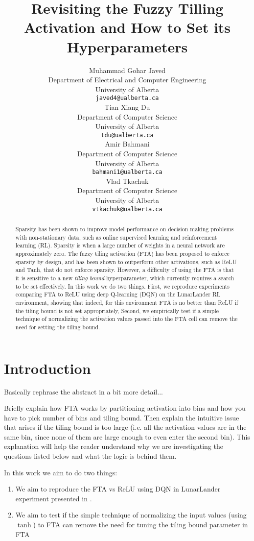 \documentclass{article}
\title{Revisiting the Fuzzy Tilling Activation and How to Set its Hyperparameters}
\author{%
  Muhammad Gohar Javed \\
  Department of Electrical and Computer Engineering \\
  University of Alberta\\
  \texttt{javed4@ualberta.ca} \\
  \And
  Tian Xiang Du \\
  Department of Computer Science\\
  University of Alberta\\
  \texttt{tdu@ualberta.ca} \\
  \AND
  Amir Bahmani \\
  Department of Computer Science\\
  University of Alberta\\
  \texttt{bahmani1@ualberta.ca} \\
  \And
  Vlad Tkachuk \\
  Department of Computer Science\\
  University of Alberta\\
  \texttt{vtkachuk@ualberta.ca} \\
}
\begin{document}
\maketitle


\begin{abstract}
  Sparsity has been shown to improve model performance on decision making problems with non-stationary data, such as online supervised learning and reinforcement learning (RL).
  Sparsity is when a large number of weights in a neural network are approximately zero.
  The fuzzy tiling activation (FTA) has been proposed to enforce sparsity by design, and has been shown to outperform other activations, such as ReLU and Tanh, that do not enforce sparsity.
  However, a difficulty of using the FTA is that it is sensitive to a new \textit{tiling bound} hyperparameter, which currently requires a search to be set effectively.
  In this work we do two things. 
  First, we reproduce experiments comparing FTA to ReLU using deep Q-learning (DQN) on the LunarLander RL environment, showing that indeed, for this environment FTA is no better than ReLU if the tiling bound is not set appropriately,
  Second, we empirically test if a simple technique of normalizing the activation values passed into the FTA cell can remove the need for setting the tiling bound.


\end{abstract}


\section{Introduction} \label{sec:intro}
Basically rephrase the abstract in a bit more detail...

Briefly explain how FTA works by partitioning activation into bins and how you have to pick number of bins and tiling bound. 
Then explain the intuitive issue that arises if the tiling bound is too large (i.e. all the activation values are in the same bin, since none of them are large enough to even enter the second bin). 
This explanation will help the reader understand why we are investigating the questions listed below and what the logic is behind them.

In this work we aim to do two things:
\begin{enumerate}
  \item We aim to reproduce the FTA vs ReLU using DQN \cite[]{mnih2013playing} in LunarLander experiment presented in \cite[]{pan2019fuzzy}.
  \item We aim to test if the simple technique of normalizing the input values (using $\tanh$) to FTA can remove the need for tuning the tiling bound parameter in FTA
\end{enumerate}
\end{document}
